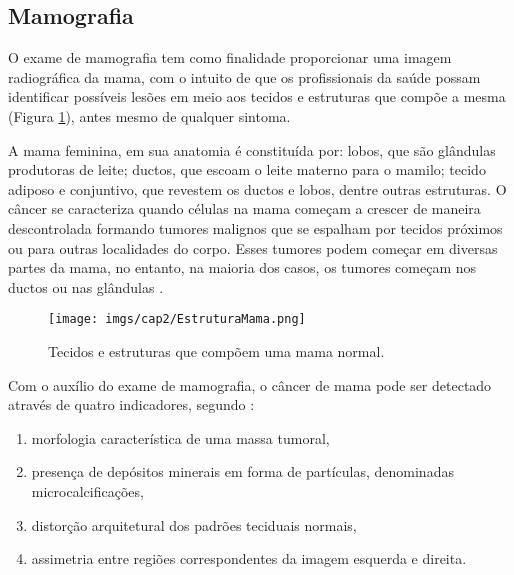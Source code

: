 \subsection{Mamografia}

O exame de mamografia tem como finalidade proporcionar uma imagem radiográfica da mama, com o intuito de que os profissionais da saúde possam identificar possíveis lesões em meio aos tecidos e estruturas que compõe a mesma (Figura \ref{fig:imgCap2EstruturaMama}), antes mesmo de qualquer sintoma. 

A mama feminina, em sua anatomia é constituída por: lobos, que são glândulas produtoras de leite; ductos, que escoam o leite materno para o mamilo; tecido adiposo e conjuntivo, que revestem os ductos e lobos, dentre outras estruturas. O câncer se caracteriza quando células na mama começam a crescer de maneira descontrolada formando tumores malignos que se espalham por tecidos próximos ou para outras localidades do corpo. Esses tumores podem começar em diversas partes da mama, no entanto, na maioria dos casos, os tumores começam nos ductos ou nas glândulas \cite{americancancersociety2017}.      

\begin{figure}[H]
	\caption{Tecidos e estruturas que compõem uma mama normal.}
	\begin{center}
		\texttt{[image: imgs/cap2/EstruturaMama.png]}
	\end{center}
	\label{fig:imgCap2EstruturaMama}
\end{figure}


Com o auxílio do exame de mamografia, o câncer de mama pode ser detectado através de quatro indicadores, segundo :

\begin{enumerate}
	\item morfologia característica de uma massa tumoral,
	\item presença de depósitos minerais em forma de partículas, denominadas microcalcificações,
	\item distorção arquitetural dos padrões teciduais normais,
	\item assimetria entre regiões correspondentes da imagem esquerda e direita.
\end{enumerate}

